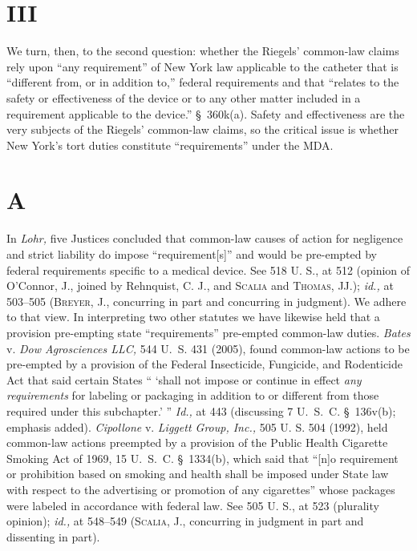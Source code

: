 {\section{III}

  We turn, then, to the second question: whether the Riegels'
common-law claims rely upon ``any requirement'' of New York law
applicable to the catheter that is ``different from, or in addition
to,'' federal requirements and that ``relates to the safety or
effectiveness of the device or to any other matter included in a
requirement applicable to the device.'' \S~360k(a). Safety and
effectiveness are the very subjects of the Riegels' common-law claims,
so the critical issue is whether New York's tort duties constitute
``requirements'' under the MDA.

\section{A}

  In \emph{Lohr,} five Justices concluded that common-law causes of action
for negligence and strict liability do impose ``requirement[s]''
and would be pre-empted by federal require\newpage ments specific to
a medical device. See 518 U. S., at 512 (opinion of O'Connor,
J., joined by Rehnquist, C. J., and \textsc{Scalia} and \textsc{Thomas,} JJ.);
\emph{id.,} at 503--505 (\textsc{Breyer,} J., concurring in part and concurring
in judgment). We adhere to that view. In interpreting two other
statutes we have likewise held that a provision pre-empting state
``requirements'' pre-empted common-law duties. \emph{Bates} v. \emph{Dow
Agrosciences LLC,} 544 U.~S. 431 (2005), found common-law actions
to be pre-empted by a provision of the Federal Insecticide, Fungicide,
and Rodenticide Act that said certain States `` ‘shall not impose or
continue in effect \emph{any requirements} for labeling or packaging in
addition to or different from those required under this subchapter.'
'' \emph{Id.,} at 443 (discussing 7 U.~S.~C. \S~136v(b); emphasis
added). \emph{Cipollone} v. \emph{Liggett Group, Inc.,} 505 U. S.
504 (1992), held common-law actions preempted by a provision of
the Public Health Cigarette Smoking Act of 1969, 15 U.~S.~C.
\S~1334(b), which said that ``[n]o requirement or prohibition based
on smoking and health shall be imposed under State law with respect
to the advertising or promotion of any cigarettes'' whose packages
were labeled in accordance with federal law. See 505 U. S., at 523
(plurality opinion); \emph{id.,} at 548--549 (\textsc{Scalia,} J., concurring
in judgment in part and dissenting in part).

}
